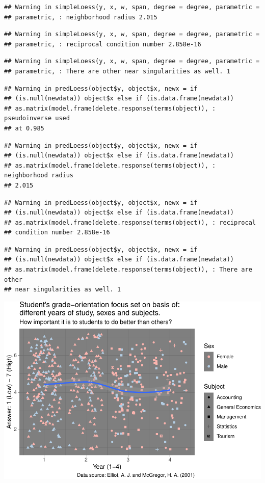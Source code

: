 \documentclass[]{article}
\begin{document}
\begin{verbatim}
## Warning in simpleLoess(y, x, w, span, degree = degree, parametric =
## parametric, : neighborhood radius 2.015
\end{verbatim}

\begin{verbatim}
## Warning in simpleLoess(y, x, w, span, degree = degree, parametric =
## parametric, : reciprocal condition number 2.858e-16
\end{verbatim}

\begin{verbatim}
## Warning in simpleLoess(y, x, w, span, degree = degree, parametric =
## parametric, : There are other near singularities as well. 1
\end{verbatim}

\begin{verbatim}
## Warning in predLoess(object$y, object$x, newx = if
## (is.null(newdata)) object$x else if (is.data.frame(newdata))
## as.matrix(model.frame(delete.response(terms(object)), : pseudoinverse used
## at 0.985
\end{verbatim}

\begin{verbatim}
## Warning in predLoess(object$y, object$x, newx = if
## (is.null(newdata)) object$x else if (is.data.frame(newdata))
## as.matrix(model.frame(delete.response(terms(object)), : neighborhood radius
## 2.015
\end{verbatim}

\begin{verbatim}
## Warning in predLoess(object$y, object$x, newx = if
## (is.null(newdata)) object$x else if (is.data.frame(newdata))
## as.matrix(model.frame(delete.response(terms(object)), : reciprocal
## condition number 2.858e-16
\end{verbatim}

\begin{verbatim}
## Warning in predLoess(object$y, object$x, newx = if
## (is.null(newdata)) object$x else if (is.data.frame(newdata))
## as.matrix(model.frame(delete.response(terms(object)), : There are other
## near singularities as well. 1
\end{verbatim}

\includegraphics{StudentGoals_files/figure-latex/unnamed-chunk-13-1.pdf}
\end{document}
